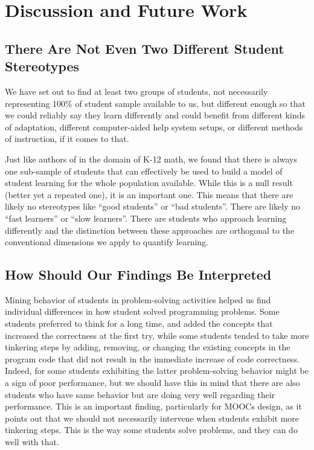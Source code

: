 \documentclass{sigchi}
\begin{document}
\section{Discussion and Future Work}

\subsection{There Are Not Even Two Different Student Stereotypes}

We have set out to find at least two groups of students, not necessarily representing 100\% of student sample available to us, but different enough so that we could reliably say they learn differently and could benefit from different kinds of adaptation, different computer-aided help system setups, or different methods of instruction, if it comes to that.

Just like authors of \cite{yudelson2014bdbbd} in the domain of K-12 math, we found that there is always one sub-sample of students that can effectively be used to build a model of student learning for the whole population available. While this is a null result (better yet a repeated one), it is an important one. This means that there are likely no stereotypes like ``good students'' or ``bad students''. There are likely no ``fast learners'' or ``slow learners''. There are students who approach learning differently and the distinction between these approaches are orthogonal to the conventional dimensions we apply to quantify learning.


\subsection{How Should Our Findings Be Interpreted}

Mining behavior of students in problem-solving activities helped us find individual differences in how student solved programming problems. Some students preferred to think for a long time, and added the concepts that increased the correctness at the first try, while some students tended to take more tinkering steps by adding, removing, or changing the existing concepts in the program code that did not result in the immediate increase of  code correctness.  Indeed, for some students exhibiting the latter problem-solving behavior might be a sign of poor performance, but we should have this in mind that there are also students who have same behavior but are doing very well regarding their performance. This is an important finding, particularly for MOOCs design, as it points out that we should not necessarily intervene when students exhibit more tinkering steps. This is the way some students solve problems, and they can do well with that.
\end{document}
